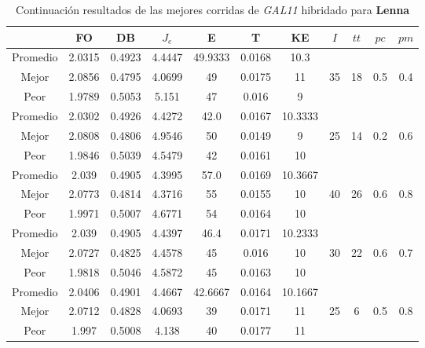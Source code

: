 \begin{table}[h!]
    \footnotesize
    \begin{center}
        \begin{tabular}{|c|c|c|c|c|c|c|c|c|c|c|}
        \hline
             & {\bf FO} & {\bf DB} & $J_e$ & {\bf E} & {\bf T} & {\bf KE} & $I$ & $tt$ & $pc$ & $pm$ \\
        \hline
        \hline
            Promedio  & 2.0315 & 0.4923 & 4.4447 & 49.9333 & 0.0168 & 10.3 &  &  &  & \\
            \cline{1-7}
            Mejor & 2.0856 & 0.4795  & 4.0699 & 49 & 0.0175 & 11 & 35 & 18 & 0.5 & 0.4\\
            \cline{1-7}
            Peor & 1.9789 & 0.5053  & 5.151 & 47 & 0.016 & 9 &  &  &  & \\
        \hline
        \hline
            Promedio  & 2.0302 & 0.4926 & 4.4272 & 42.0 & 0.0167 & 10.3333 &  &  &  & \\
            \cline{1-7}
            Mejor & 2.0808 & 0.4806  & 4.9546 & 50 & 0.0149 & 9 & 25 & 14 & 0.2 & 0.6\\
            \cline{1-7}
            Peor & 1.9846 & 0.5039  & 4.5479 & 42 & 0.0161 & 10 &  &  &  & \\
        \hline
        \hline
            Promedio  & 2.039 & 0.4905 & 4.3995 & 57.0 & 0.0169 & 10.3667 &  &  &  & \\
            \cline{1-7}
            Mejor & 2.0773 & 0.4814  & 4.3716 & 55 & 0.0155 & 10 & 40 & 26 & 0.6 & 0.8\\
            \cline{1-7}
            Peor & 1.9971 & 0.5007  & 4.6771 & 54 & 0.0164 & 10 &  &  &  & \\
        \hline
        \hline
            Promedio  & 2.039 & 0.4905 & 4.4397 & 46.4 & 0.0171 & 10.2333 &  &  &  & \\
            \cline{1-7}
            Mejor & 2.0727 & 0.4825  & 4.4578 & 45 & 0.016 & 10 & 30 & 22 & 0.6 & 0.7\\
            \cline{1-7}
            Peor & 1.9818 & 0.5046  & 4.5872 & 45 & 0.0163 & 10 &  &  &  & \\
        \hline
        \hline
            Promedio  & 2.0406 & 0.4901 & 4.4667 & 42.6667 & 0.0164 & 10.1667 &  &  &  & \\
            \cline{1-7}
            Mejor & 2.0712 & 0.4828  & 4.0693 & 39 & 0.0171 & 11 & 25 & 6 & 0.5 & 0.8\\
            \cline{1-7}
            Peor & 1.997 & 0.5008  & 4.138 & 40 & 0.0177 & 11 &  &  &  & \\
        \hline
        \end{tabular}
        \caption{Continuaci\'on resultados de las mejores corridas de \emph{GAL11} hibridado para {\bf Lenna}}
        \label{tb:tablecGAL11}
    \end{center}
\end{table}
